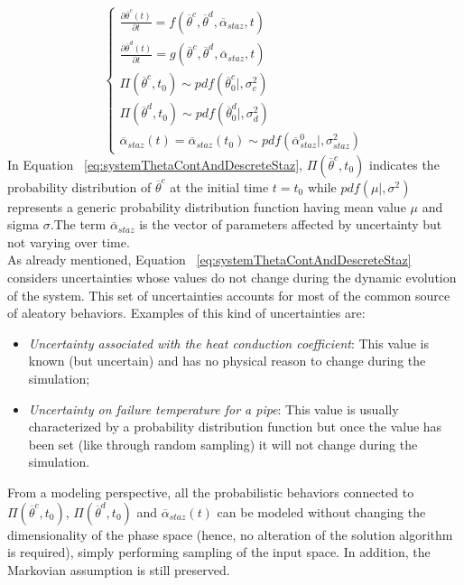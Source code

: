 \begin{equation}
\label{eq:systemThetaContAndDescreteStaz}
\left\{\begin{matrix}
\frac{\partial  \overline{\theta}^{c}\left ( t \right )}{\partial t}=f\left ( \overline{\theta}^{c},\overline{\theta}^{d}, \overline{\alpha}_{staz} ,      t \right ) \\
\frac{\partial  \overline{\theta}^{d}\left ( t \right )}{\partial t}=g\left ( \overline{\theta}^{c},\overline{\theta}^{d},\overline{\alpha}_{staz},t \right )\\
\Pi \left ( \overline{\theta}^{c},t_{0} \right ) \sim pdf\left ( \overline{\theta}^{c}_{0}|,\sigma_{c}^{2} \right )\\
\Pi \left ( \overline{\theta}^{d},t_{0} \right ) \sim pdf\left ( \overline{\theta}^{d}_{0}|,\sigma_{d}^{2} \right ) \\
\overline{\alpha}_{staz}\left ( t \right )=\overline{\alpha}_{staz}\left ( t_{0} \right ) \sim pdf\left ( \overline{\alpha}_{staz}^{0}|, \sigma_{staz}^{2} \right )
\end{matrix}\right.
\end{equation}
In Equation ~\ref{eq:systemThetaContAndDescreteStaz}, $\Pi \left ( \overline{\theta}^{c},t_{0} \right )$ indicates the
probability distribution of $\overline{\theta}^{c}$ at the initial time $t=t_{0}$ while
$pdf\left ( \mu|, \sigma^{2} \right )$ represents a generic probability distribution function having mean value
$\mu$ and sigma $\sigma$.The term $\overline{\alpha}_{staz}$ is the vector of parameters affected by
uncertainty but not varying over time.
\\As already mentioned, Equation ~\ref{eq:systemThetaContAndDescreteStaz} considers uncertainties whose values
do not change during the dynamic evolution of the system. This set of uncertainties accounts for most of the
common source of aleatory behaviors. Examples of this kind of uncertainties are:
\begin{itemize}
  \item \textit{Uncertainty associated with the heat conduction coefficient}:  This value is known (but uncertain) and has no physical reason to change during the simulation;
  \item \textit{Uncertainty on failure temperature for a pipe}: This value is usually characterized by a probability distribution function but once the value has been set (like through random sampling) it will not change during the simulation.
\end{itemize}
From a modeling perspective, all the probabilistic behaviors connected to $\Pi \left ( \overline{\theta}^{c},t_{0}
\right ) $, $\Pi \left ( \overline{\theta}^{d},t_{0} \right )$ and $\overline{\alpha}_{staz}(t)$ can be modeled without
changing the dimensionality of the phase space (hence, no alteration of the solution algorithm is required), simply performing sampling of the input space. In addition, the Markovian assumption is still preserved.

